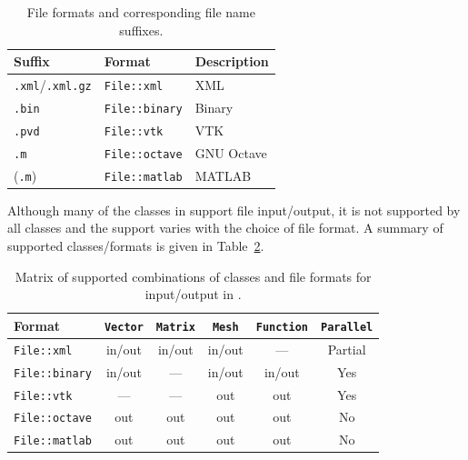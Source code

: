 \begin{table}[htbp]
  \begin{center}
    \begin{tabular}{|l|l|l|}
      \hline
      Suffix & Format & Description \\
      \hline
      \hline
      \texttt{.xml}/\texttt{.xml.gz} & \texttt{File::xml} & \dolfin{} XML \\
      \hline
      \texttt{.bin}  & \texttt{File::binary} & \dolfin{} Binary \\
      \hline
      \texttt{.pvd} & \texttt{File::vtk} & VTK \\
      \hline
      \texttt{.m} & \texttt{File::octave} & GNU Octave \\
      \hline
      (\texttt{.m}) & \texttt{File::matlab} & MATLAB \\
      \hline
    \end{tabular}
    \caption{File formats and corresponding file name suffixes.}
    \label{tab:formats}
  \end{center}
\end{table}

Although many of the classes in \dolfin{} support file input/output,
it is not supported by all classes and the support varies with the
choice of file format. A summary of supported classes/formats is
given in Table~\ref{tab:classes,formats}.

\begin{table}[htbp]
  \begin{center}
    \begin{tabular}{|l||c|c|c|c|c|}
      \hline
      Format           & \texttt{Vector} & \texttt{Matrix} & \texttt{Mesh} & \texttt{Function}  & \texttt{Parallel}\\
      \hline
      \hline
      \texttt{File::xml}     & in/out & in/out & in/out & --- & Partial \\
      \hline
      \texttt{File::binary}     & in/out & --- & in/out & in/out & Yes\\
      \hline
      \texttt{File::vtk}     & ---    & ---    & out    & out  & Yes \\
      \hline
      \texttt{File::octave}  & out    & out    & out    & out  & No \\
      \hline
      \texttt{File::matlab}  & out    & out    & out    & out  & No\\
      \hline
    \end{tabular}
    \caption{Matrix of supported combinations of classes and file
      formats for input/output in \dolfin{}.}
    \label{tab:classes,formats}
  \end{center}
\end{table}

